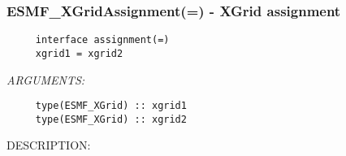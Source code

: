  
\setlength{\oldparskip}{\parskip}
\setlength{\parskip}{1.5ex}
\setlength{\oldparindent}{\parindent}
\setlength{\parindent}{0pt}
\setlength{\oldbaselineskip}{\baselineskip}
\setlength{\baselineskip}{11pt}
 
\def\bv{\begin{verbatim}}
\def\ev{\end{verbatim}}
\def\be{\begin{equation}}
\def\ee{\end{equation}}
\def\bea{\begin{eqnarray}}
\def\eea{\end{eqnarray}}
\def\bi{\begin{itemize}}
\def\ei{\end{itemize}}
\def\bn{\begin{enumerate}}
\def\en{\end{enumerate}}
\def\bd{\begin{description}}
\def\ed{\end{description}}
\def\({\left (}
\def\){\right )}
\def\[{\left [}
\def\]{\right ]}
\def\<{\left  \langle}
\def\>{\right \rangle}
\def\cI{{\cal I}}
\def\diag{\mathop{\rm diag}}
\def\tr{\mathop{\rm tr}}


 
\subsubsection [ESMF\_XGridAssignment(=)] {ESMF\_XGridAssignment(=) - XGrid assignment}


  
\begin{verbatim}     interface assignment(=)
     xgrid1 = xgrid2\end{verbatim}{\em ARGUMENTS:}
\begin{verbatim}     type(ESMF_XGrid) :: xgrid1
     type(ESMF_XGrid) :: xgrid2\end{verbatim}
{\sf DESCRIPTION:\\ }


